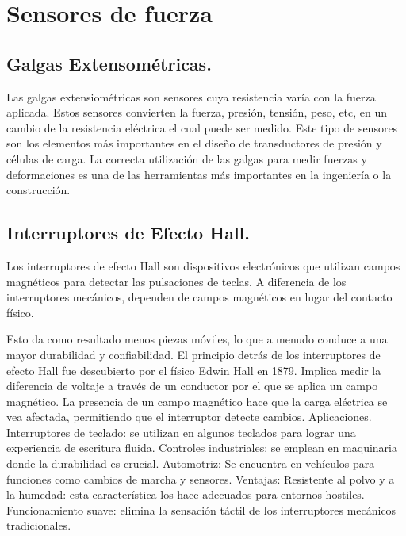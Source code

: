 \section{Sensores de fuerza}
\subsection{Galgas Extensométricas.}

Las galgas extensiométricas son sensores cuya resistencia varía con la fuerza aplicada. Estos sensores convierten la fuerza, presión, tensión, peso, etc, en un cambio de la resistencia eléctrica el cual puede ser medido.
Este tipo de sensores son los elementos más importantes en el diseño de transductores de presión y células de carga. La correcta utilización de las galgas para medir fuerzas y deformaciones es una de las herramientas más importantes en la ingeniería o la construcción.

\subsection{Interruptores de Efecto Hall.}

Los interruptores de efecto Hall son dispositivos electrónicos que utilizan campos magnéticos para detectar las pulsaciones de teclas. A diferencia de los interruptores mecánicos, dependen de campos magnéticos en lugar del contacto físico.

Esto da como resultado menos piezas móviles, lo que a menudo conduce a una mayor durabilidad y confiabilidad.
El principio detrás de los interruptores de efecto Hall fue descubierto por el físico Edwin Hall en 1879. Implica medir la diferencia de voltaje a través de un conductor por el que se aplica un campo magnético.
La presencia de un campo magnético hace que la carga eléctrica se vea afectada, permitiendo que el interruptor detecte cambios.
Aplicaciones.
Interruptores de teclado: se utilizan en algunos teclados para lograr una experiencia de escritura fluida.
Controles industriales: se emplean en maquinaria donde la durabilidad es crucial.
Automotriz: Se encuentra en vehículos para funciones como cambios de marcha y sensores.
Ventajas:
Resistente al polvo y a la humedad: esta característica los hace adecuados para entornos hostiles.
Funcionamiento suave: elimina la sensación táctil de los interruptores mecánicos tradicionales.



